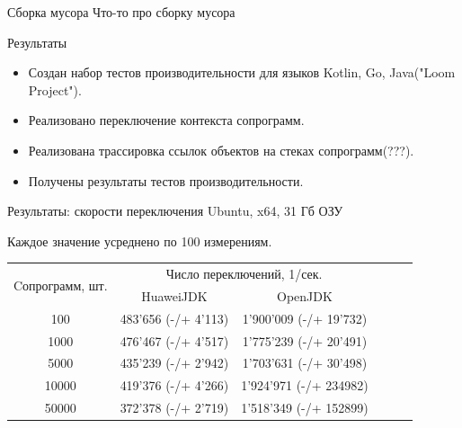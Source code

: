 \begin{frame}{Сборка мусора}
	Что-то про сборку мусора
\end{frame}	
	
\begin{frame}{Результаты}
	\begin{itemize}
	\item Создан набор тестов производительности для языков Kotlin, Go, Java("Loom Project").
	\item Реализовано переключение контекста сопрограмм.
	\item Реализована трассировка ссылок объектов на стеках сопрограмм(???).
	\item Получены результаты тестов производительности.
	\end{itemize}
\end{frame}

\begin{frame}{Результаты: скорости переключения}
	Ubuntu, x64, 31 Гб ОЗУ
	\par Каждое значение усреднено по 100 измерениям.
	\begin{table}[H]
		\begin{tabular}{|c|c|c|c|c|c|}
			\hline \multirow{2}{*}{Cопрограмм, шт.} & \multicolumn{2}{|c|}{Число переключений, 1/сек.}    \\
			\cline{2-3}    & HuaweiJDK          & OpenJDK                \\%
			\hline 100     & 483'656 (-/+ 4'113) & 1'900'009 (-/+ 19'732)\\%
			\hline 1000    & 476'467 (-/+ 4'517) & 1'775'239 (-/+ 20'491)\\%
			\hline 5000    & 435'239 (-/+ 2'942) & 1'703'631 (-/+ 30'498)\\%
			\hline 10000   & 419'376 (-/+ 4'266) & 1'924'971 (-/+ 234982)\\%
			\hline 50000   & 372'378 (-/+ 2'719) & 1'518'349 (-/+ 152899)\\%
			\hline 
		\end{tabular}
	\end{table}
	
\end{frame}

